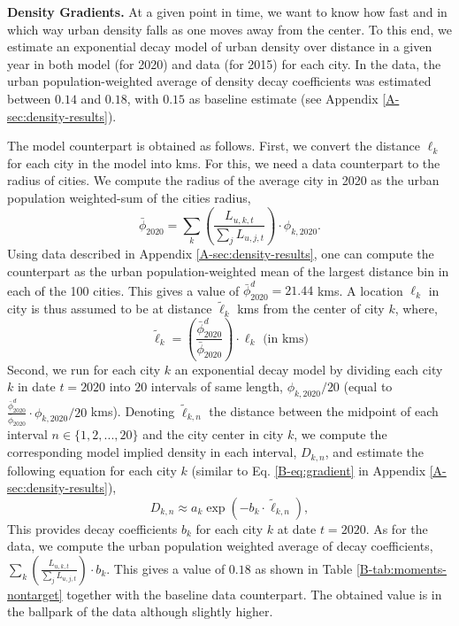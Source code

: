 \documentclass[11pt]{report}
\begin{document}
\textbf{Density Gradients.}\label{B-sec:density-gradients} At a given point in time, we want to know how fast and in which way urban density falls as one moves away from the center. To this end, we estimate an exponential decay model of urban density over distance in a given year in both model (for 2020) and data (for 2015) for each city. In the data, the urban population-weighted average of density decay coefficients was estimated between $0.14$ and $0.18$, with $0.15$ as baseline estimate (see Appendix \ref{A-sec:density-results}). 

The model counterpart is obtained as follows. First, we convert the distance $\ell_k$ for each city in the model into kms. For this, we need a data counterpart to the radius of cities. We compute the radius of the average city in 2020 as the urban population weighted-sum of the cities radius, $$\bar{\phi}_{2020}=\sum_k \left( \frac{L_{u,k,t}}{\sum_j L_{u,j,t}}\right) \cdot \phi_{k,2020}.$$ Using data described in Appendix \ref{A-sec:density-results}, one can compute the counterpart as the urban population-weighted mean of the largest distance bin in each of the 100 cities. This gives a value of $\bar{\phi}^{d}_{2020}=21.44$ kms. A location $\ell_k$ in city is thus assumed to be at distance $\tilde{\ell}_k$ kms from the center of city $k$, where,
$$\tilde{\ell}_k=\left( \frac{\bar{\phi}^{d}_{2020}}{\bar{\phi}_{2020}}\right)  \cdot \ell_k  \text{ (in kms)}$$
Second, we run for each city $k$ an exponential decay model by dividing each city $k$ in date $t=2020$ into $20$ intervals of same length, $\phi_{k,2020}/20$ (equal to $\frac{\bar{\phi}^{d}_{2020}}{\bar{\phi}_{2020}}\cdot \phi_{k,2020}/20$ kms). Denoting $\tilde{\ell}_{k,n}$ the distance between the midpoint of each interval $n \in \{1, 2, ..., 20\}$ and the city center in city $k$, we compute the corresponding model implied density in each interval, $D_{k,n}$, and estimate  the following equation for each city $k$ (similar to Eq. \ref{B-eq:gradient} in Appendix \ref{A-sec:density-results}),
\begin{equation}
D_{k,n}\approx a_k\exp(-b_k \cdot \tilde{\ell}_{k,n}), \label{B-eq:gradient}
\end{equation}
This provides decay coefficients $b_k$ for each city $k$ at date $t=2020$. As for the data, we compute the urban population weighted average of decay coefficients, $\sum_k \left( \frac{L_{u,k,t}}{\sum_j L_{u,j,t}}\right) \cdot b_k$. This gives a value of $0.18$ as shown in Table \ref{B-tab:moments-nontarget} together with the baseline data counterpart. The obtained value is in the ballpark of the data although slightly higher. 
\end{document}

